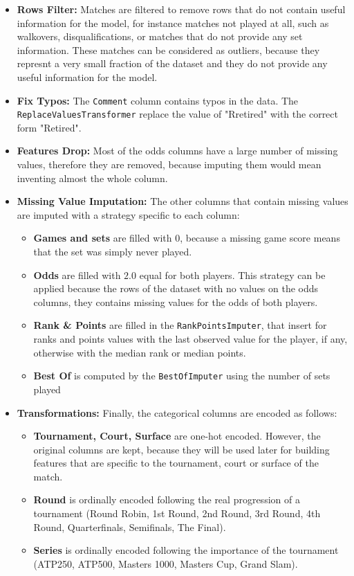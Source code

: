 \documentclass{article}
\begin{document}
\begin{itemize}
  \item \textbf{Rows Filter:} Matches are filtered to remove rows that do not contain useful information for the model, for
  instance matches not played at all, such as walkovers, disqualifications, or matches that do not provide any set information.
  These matches can be considered as outliers, because they represnt a very small fraction of the dataset and they do not
  provide any useful information for the model.
  \item \textbf{Fix Typos:} The \texttt{Comment} column contains typos in the data. The \texttt{ReplaceValuesTransformer} replace
  the value of "Rretired" with the correct form "Retired".
  \item \textbf{Features Drop:} Most of the odds columns have a large number of missing values, therefore they
  are removed, because imputing them would mean
  inventing almost the whole column.
  \item \textbf{Missing Value Imputation:} The other columns that contain missing values are imputed with a 
  strategy specific
  to each column:
  \begin{itemize}
    \item \textbf{Games and sets} are filled with $0$, because a missing game score means that the set was simply never played.
    \item \textbf{Odds} are filled with $2.0$ equal for both players. This strategy can be applied 
    because the rows of the dataset with no values on the odds columns, they
    contains missing values for the odds of both players.
    \item \textbf{Rank \& Points} are filled in the \texttt{RankPointsImputer}, that insert for ranks and points 
    values with the last
observed value for the player, if any, otherwise with the median rank or median points.
    \item \textbf{Best Of} is computed by the \texttt{BestOfImputer} using the number of sets played 
  \end{itemize}
  \item \textbf{Transformations:} Finally, the categorical columns are encoded as follows:
  \begin{itemize}
    \item \textbf{Tournament, Court, Surface} are one-hot encoded. However, the original columns
    are kept, because they will be used later for building features that are specific to the tournament,
    court or surface of the match.
    \item \textbf{Round} is ordinally encoded following the real progression of a tournament (Round Robin, 
    1st Round, 2nd Round, 3rd Round, 4th Round, Quarterfinals, Semifinals, The Final).
    \item \textbf{Series} is ordinally encoded following the importance of the tournament
    (ATP250, ATP500, Masters 1000, Masters Cup, Grand Slam).
  \end{itemize}
\end{itemize}
\end{document}

